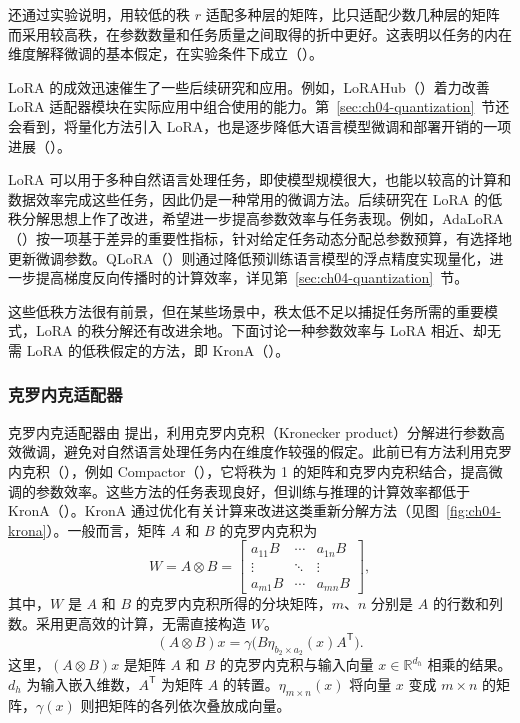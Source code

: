 还通过实验说明，用较低的秩 $r$ 适配多种层的矩阵，比只适配少数几种层的矩阵而采用较高秩，在参数数量和任务质量之间取得的折中更好。这表明以任务的内在维度解释微调的基本假定，在实验条件下成立（）。

LoRA 的成效迅速催生了一些后续研究和应用。例如，LoRAHub（）着力改善 LoRA 适配器模块在实际应用中组合使用的能力。第~\ref{sec:ch04-quantization}~节还会看到，将量化方法引入 LoRA，也是逐步降低大语言模型微调和部署开销的一项进展（）。

LoRA 可以用于多种自然语言处理任务，即使模型规模很大，也能以较高的计算和数据效率完成这些任务，因此仍是一种常用的微调方法。后续研究在 LoRA 的低秩分解思想上作了改进，希望进一步提高参数效率与任务表现。例如，AdaLoRA（）按一项基于差异的重要性指标，针对给定任务动态分配总参数预算，有选择地更新微调参数。QLoRA（）则通过降低预训练语言模型的浮点精度实现量化，进一步提高梯度反向传播时的计算效率，详见第~\ref{sec:ch04-quantization}~节。

这些低秩方法很有前景，但在某些场景中，秩太低不足以捕捉任务所需的重要模式，LoRA 的秩分解还有改进余地。下面讨论一种参数效率与 LoRA 相近、却无需 LoRA 的低秩假定的方法，即 KronA（）。

\subsubsection{克罗内克适配器}
克罗内克适配器由 提出，利用克罗内克积（Kronecker product）分解进行参数高效微调，避免对自然语言处理任务内在维度作较强的假定。此前已有方法利用克罗内克积（），例如 Compactor（），它将秩为 1 的矩阵和克罗内克积结合，提高微调的参数效率。这些方法的任务表现良好，但训练与推理的计算效率都低于 KronA（）。KronA 通过优化有关计算来改进这类重新分解方法（见图~\ref{fig:ch04-krona}）。一般而言，矩阵 $A$ 和 $B$ 的克罗内克积为
\begin{equation}
W=A\otimes B=
\begin{bmatrix}
a_{11}B & \cdots & a_{1n}B\\
\vdots & \ddots & \vdots\\
a_{m1}B & \cdots & a_{mn}B
\end{bmatrix},
\label{eq:ch04-kronecker}
\end{equation}
其中，$W$ 是 $A$ 和 $B$ 的克罗内克积所得的分块矩阵，$m$、$n$ 分别是 $A$ 的行数和列数。采用更高效的计算，无需直接构造 $W$。
\begin{equation}
(A\otimes B)x=\gamma\bigl(B\eta_{b_2\times a_2}(x)A^{\mathsf T}\bigr).
\label{eq:ch04-kronecker-product}
\end{equation}
这里，$(A\otimes B)x$ 是矩阵 $A$ 和 $B$ 的克罗内克积与输入向量 $x\in\mathbb{R}^{d_h}$ 相乘的结果。$d_h$ 为输入嵌入维数，$A^{\mathsf T}$ 为矩阵 $A$ 的转置。$\eta_{m\times n}(x)$ 将向量 $x$ 变成 $m\times n$ 的矩阵，$\gamma(x)$ 则把矩阵的各列依次叠放成向量。

